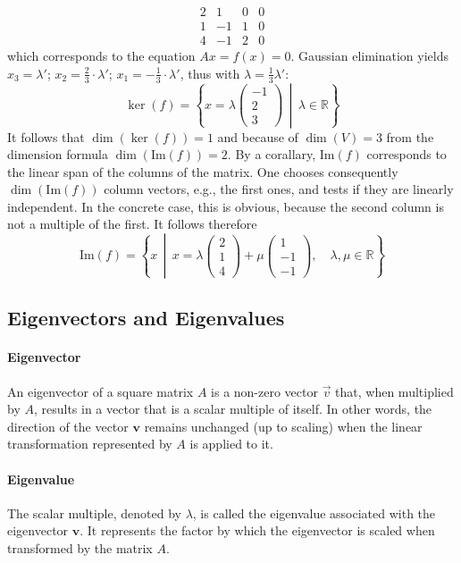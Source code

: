 \[
\begin{array}{cccc}
2 & 1 & 0 & 0 \\
1 & -1 & 1 & 0 \\
4 & -1 & 2 & 0
\end{array}
\]
which corresponds to the equation $Ax = f(x) = 0$. Gaussian elimination yields $x_3 = \lambda'$; $x_2 = \frac{2}{3} \cdot \lambda'$; $x_1 = -\frac{1}{3} \cdot \lambda'$, thus with $\lambda = \frac{1}{3} \lambda'$:
\[
\ker(f) =
\left\{
x = \lambda
\begin{pmatrix}
-1 \\
2 \\
3
\end{pmatrix}
\, \middle| \, \lambda \in \mathbb{R}
\right\}
\]
It follows that $\dim(\ker(f)) = 1$ and because of $\dim(V) = 3$ from the dimension 
formula $\dim(\text{Im}(f)) = 2$. By a corallary, $\text{Im}(f)$ corresponds to the linear 
span of the columns of the matrix. One chooses consequently $\dim(\text{Im}(f))$ column vectors, e.g., the first ones, and tests if they are linearly independent. In the concrete case, this is obvious, because the second column is 
not a multiple of the first. It follows therefore
\[
\text{Im}(f) =
\left\{
x \, \middle| \, x = \lambda
\begin{pmatrix}
2 \\
1 \\
4
\end{pmatrix} + \mu
\begin{pmatrix}
1 \\
-1 \\
-1
\end{pmatrix}
, \quad \lambda, \mu \in \mathbb{R}
\right\}
\]

\subsection{Eigenvectors and Eigenvalues}

\paragraph{Eigenvector}
An eigenvector of a square matrix $A$ is a non-zero vector $\vec{v}$ that, when multiplied by $A$, results in a vector that is a scalar multiple of itself. In other words, the direction of the vector $\mathbf{v}$ remains unchanged (up to scaling) when the linear transformation represented by $A$ is applied to it.

\paragraph{Eigenvalue}
The scalar multiple, denoted by $\lambda$, is called the eigenvalue associated with the eigenvector $\mathbf{v}$. It represents the factor by which the eigenvector is scaled when transformed by the matrix $A$.

